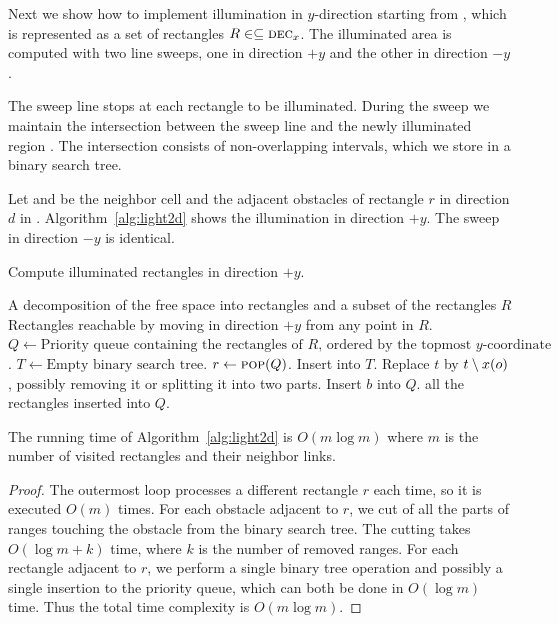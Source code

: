 \documentclass[english,gradu]{tktltiki2018}
\begin{document}
Next we show how to implement illumination in $y$-direction starting from , which is represented as a set of rectangles $R\in\subseteq\textsc{dec}_{x}$.
The illuminated area is computed with two line sweeps, one in direction $+y$ and the other in direction $-y$.

The sweep line stops at each rectangle to be illuminated.
During the sweep we maintain the intersection between the sweep line and the newly illuminated region .
The intersection consists of non-overlapping intervals, which we store in a binary search tree.

Let  and  be the neighbor cell and the adjacent obstacles of rectangle $r$ in direction $d$ in .
Algorithm~\ref{alg:light2d} shows the illumination in direction $+y$.
The sweep in direction $-y$ is identical.

\begin{algorithm}
\caption{Compute illuminated rectangles in direction $+y$.}\label{alg:light2d}
\begin{algorithmic}
\Require A decomposition of the free space into rectangles and a subset of the rectangles $R$
\Ensure Rectangles reachable by moving in direction $+y$ from any point in $R$.
\State $Q\gets\text{Priority queue containing the rectangles of $R$, ordered by the topmost $y$-coordinate}$.
\State $T\gets\text{Empty binary search tree}$.
	\State $r\gets\textsc{pop}(Q)$.
		\State Insert  into $T$.
	\EndIf
			\State Replace $t$ by $t\setminus x(o)$, possibly removing it or splitting it into two parts.
		\EndFor
	\EndFor
			\State Insert $b$ into $Q$.
		\EndIf
	\EndFor
\EndWhile
\State \Return all the rectangles inserted into $Q$.
\end{algorithmic}
\end{algorithm}

\begin{lem}\label{lem:light2dtime}The running time of Algorithm~\ref{alg:light2d} is $O(m\log m)$ where $m$ is the number of visited rectangles and their neighbor links.\end{lem}
\begin{proof}
The outermost loop processes a different rectangle $r$ each time, so it is executed $O(m)$ times.
For each obstacle adjacent to $r$, we cut of all the parts of ranges touching the obstacle from the binary search tree.
The cutting takes $O(\log m + k)$ time, where $k$ is the number of removed ranges.
For each rectangle adjacent to $r$, we perform a single binary tree operation and possibly a single insertion to the priority queue, which can both be done in $O(\log m)$ time.
Thus the total time complexity is $O(m\log m)$.
\end{proof}
\end{document}

